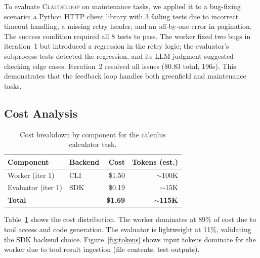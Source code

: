 \documentclass{article}
\begin{document}
To evaluate \textsc{Claudeloop} on maintenance tasks, we applied it to a bug-fixing scenario: a Python HTTP client library with 3 failing tests due to incorrect timeout handling, a missing retry header, and an off-by-one error in pagination. The success condition required all 8 tests to pass. The worker fixed two bugs in iteration~1 but introduced a regression in the retry logic; the evaluator's subprocess tests detected the regression, and its LLM judgment suggested checking edge cases. Iteration~2 resolved all issues (\$0.83 total, 196s). This demonstrates that the feedback loop handles both greenfield and maintenance tasks.

\subsection{Cost Analysis}

\begin{table}[t]
\centering
\caption{Cost breakdown by component for the calculus calculator task.}
\label{tab:cost}
\begin{tabular}{@{}llrr@{}}
\toprule
\textbf{Component} & \textbf{Backend} & \textbf{Cost} & \textbf{Tokens (est.)} \\
\midrule
Worker (iter 1) & CLI & \$1.50 & $\sim$100K \\
Evaluator (iter 1) & SDK & \$0.19 & $\sim$15K \\
\midrule
\textbf{Total} & & \textbf{\$1.69} & \textbf{$\sim$115K} \\
\bottomrule
\end{tabular}
\end{table}

Table~\ref{tab:cost} shows the cost distribution. The worker dominates at 89\% of cost due to tool access and code generation. The evaluator is lightweight at 11\%, validating the SDK backend choice. Figure~\ref{fig:tokens} shows input tokens dominate for the worker due to tool result ingestion (file contents, test outputs).
\end{document}
